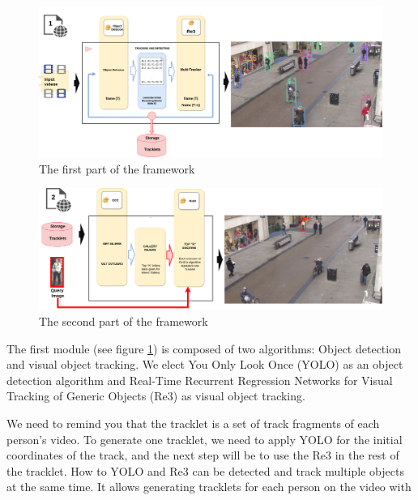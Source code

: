 \documentclass[a4paper]{article}
\begin{document}
\begin{figure}[ht]
    \centering
    \includegraphics[width=15cm]{imgs/new_model_tesis_2021_part1.png}
    \caption[test framework part 1]{The first part of the framework}
    \label{fig:framework_part1}
\end{figure}\leavevmode\newline

\begin{figure}[ht]
    \centering
    \includegraphics[width=15cm]{imgs/new_model_tesis_2021_part2.png}
    \caption[test framework part 2]{The second part of the framework}
    \label{fig:framework_part2}
\end{figure}\leavevmode\newline


The first module (see figure \ref{fig:framework_part1}) is composed of two algorithms: Object detection and visual object tracking.  We elect  You Only Look Once (YOLO) \cite{YOLO} as an object detection algorithm and Real-Time Recurrent Regression Networks for Visual Tracking of Generic Objects (Re3) \cite{re3} as visual object tracking. 

\leavevmode\newline
We need to remind you that the tracklet is a set of track fragments of each person's video. To generate one tracklet, we need to apply YOLO for the initial coordinates of the track, and the next step will be to use the Re3 in the rest of the tracklet. How to YOLO and Re3 can be detected and track multiple objects at the same time. It allows generating tracklets for each person on the video with 
\end{document}
